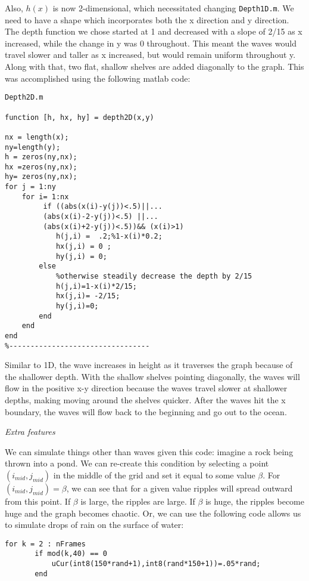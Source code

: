 \documentclass[12pt]{article}
\begin{document}
\begin{enumerate}
{{Also, $h(x)$ is now 2-dimensional, which necessitated changing \texttt{Depth1D.m}. We need to have a shape which incorporates both the x direction and y direction. The depth function we chose started at 1 and decreased with a slope of 2/15 as x increased, while the change in y was 0 throughout. This meant the waves would travel slower and taller as x increased, but would remain uniform throughout y. Along with that, two flat, shallow shelves are added diagonally to the graph. This was accomplished using the following matlab code:}

\begin{verbatim}
Depth2D.m

function [h, hx, hy] = depth2D(x,y)

nx = length(x);
ny=length(y);
h = zeros(ny,nx);
hx =zeros(ny,nx);
hy= zeros(ny,nx);
for j = 1:ny
    for i= 1:nx
         if ((abs(x(i)-y(j))<.5)||...
         (abs(x(i)-2-y(j))<.5) ||...
         (abs(x(i)+2-y(j))<.5))&& (x(i)>1) 
            h(j,i) =  .2;%1-x(i)*0.2;
            hx(j,i) = 0 ;
            hy(j,i) = 0;
        else
            %otherwise steadily decrease the depth by 2/15
            h(j,i)=1-x(i)*2/15;
            hx(j,i)= -2/15;
            hy(j,i)=0;
        end
    end
end
%---------------------------------
\end{verbatim}
Similar to 1D, the wave increases in height as it traverses the graph because of the shallower depth.  With  the shallow shelves pointing diagonally, the waves will flow in the positive x-y direction because the waves travel slower at shallower depths, making moving around the shelves quicker. After the waves hit the x boundary, the waves will flow back to the beginning and go out to the ocean.  

\large{\item\textit{Extra features}}

\normalsize{We can simulate things other than waves given this code: imagine a rock being thrown into a pond.  We can re-create this condition by selecting a point $(i_{mid},j_{mid})$ in the middle of the grid and set it equal to some value $\beta$.  For $(i_{mid},j_{mid}) = \beta$, we can see that for a given value ripples will spread outward from this point.  If $\beta$ is large, the ripples are large.  If $\beta$ is huge, the ripples become huge and the graph becomes chaotic.  Or, we can use the following code allows us to simulate drops of rain on the surface of water:}

\begin{verbatim}
for k = 2 : nFrames
       if mod(k,40) == 0
       	   uCur(int8(150*rand+1),int8(rand*150+1))=.05*rand;
       end
       

\end{verbatim}}
\end{enumerate}
\end{document}
